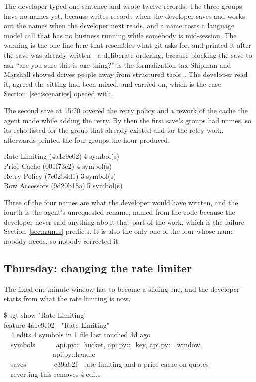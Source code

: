 \noindent
The developer typed one sentence and \sgt{} wrote twelve records. The three groups
have no names yet, because \sgt{} writes records when the developer saves and works
out the names when the developer next reads, and a name costs a language model call
that has no business running while somebody is mid-session. The warning is the one
line here that resembles what git asks for, and \sgt{} printed it after the save was
already written---a deliberate ordering, because blocking the save to ask ``are you
sure this is one thing?'' is the formalization tax Shipman and Marshall showed
drives people away from structured tools~\cite{shipman1999}. The developer read it,
agreed the sitting had been mixed, and carried on, which is the case
Section~\ref{sec:scenarios} opened with.

The second save at 15:20 covered the retry policy and a rework of the cache the
agent made while adding the retry. By then the first save's groups had names, so its echo listed
 for the group that already existed and
 for the retry work.
 afterwards printed the four groups the hour produced.

\begin{out}
Rate Limiting (4a1c9e02) \ttdot{} 4 symbol(s)\\
Price Cache (001f73c2) \ttdot{} 4 symbol(s)\\
Retry Policy (7c02b4d1) \ttdot{} 3 symbol(s)\\
Row Accessors (9d20b18a) \ttdot{} 5 symbol(s)
\end{out}

\noindent
Three of the four names are what the developer would have written, and the fourth is
the agent's unrequested rename, named from the code because the developer never said
anything about that part of the work, which is the failure Section~\ref{sec:names}
predicts. It is also the only one of the four whose name nobody needs, so nobody
corrected it.

\subsection{Thursday: changing the rate limiter}

The fixed one minute window has to become a sliding one, and the developer starts
from what the rate limiting is now.

\begin{out}
\$ sgt show "Rate Limiting"\\
feature 4a1c9e02~~"Rate Limiting"\\
~~4 edits \ttdot{} 4 symbols in 1 file \ttdot{} last touched 3d ago\\
~~symbols~~~~~~api.py::\_bucket, api.py::\_key, api.py::\_window,\\
~~~~~~~~~~~~~~api.py::handle\\
~~saves~~~~~~~~c39ab2f~~rate limiting and a price cache on quotes\\
~~reverting this removes 4 edits
\end{out}

